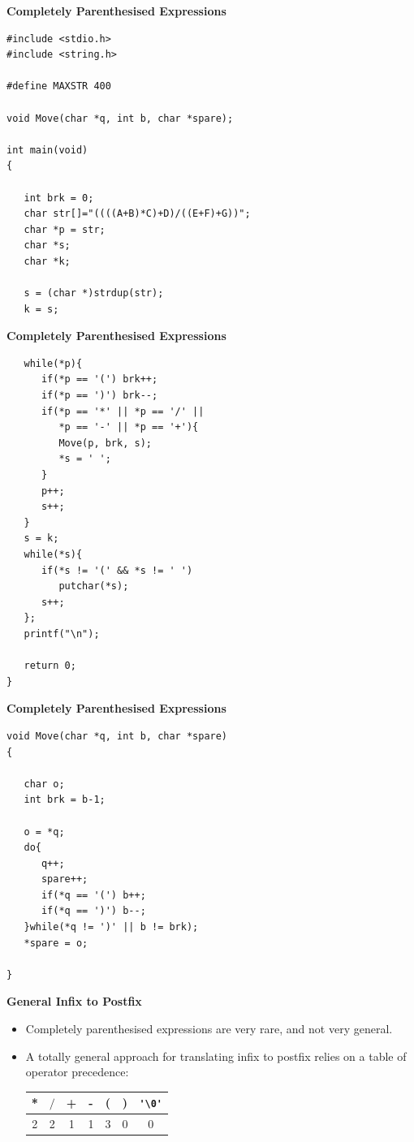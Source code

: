 \documentclass[a4,portraitt]{slides}
\begin{document}
\newpage
{\samepage
\begin{center}
{\Large{\bf Completely Parenthesised Expressions}}
\end{center}
{\small
\begin{verbatim}
#include <stdio.h>
#include <string.h>

#define MAXSTR 400

void Move(char *q, int b, char *spare);

int main(void)
{

   int brk = 0;
   char str[]="((((A+B)*C)+D)/((E+F)+G))";
   char *p = str;
   char *s;
   char *k;

   s = (char *)strdup(str);
   k = s;
\end{verbatim}
}}

\newpage
{\samepage
\begin{center}
{\Large{\bf Completely Parenthesised Expressions}}
\end{center}
{\small
\begin{verbatim}
   while(*p){
      if(*p == '(') brk++;
      if(*p == ')') brk--;
      if(*p == '*' || *p == '/' ||
         *p == '-' || *p == '+'){
         Move(p, brk, s);
         *s = ' ';
      }
      p++;
      s++;
   }
   s = k;
   while(*s){
      if(*s != '(' && *s != ' ')
         putchar(*s);
      s++;
   };
   printf("\n");

   return 0;
}
\end{verbatim}
}

\newpage
{\samepage
\begin{center}
{\Large{\bf Completely Parenthesised Expressions}}
\end{center}
\begin{verbatim}
void Move(char *q, int b, char *spare)
{

   char o;
   int brk = b-1;

   o = *q;
   do{
      q++;
      spare++;
      if(*q == '(') b++;
      if(*q == ')') b--;
   }while(*q != ')' || b != brk);
   *spare = o;

}
\end{verbatim}
}

\newpage
{\samepage
\begin{center}
{\Large{\bf General Infix to Postfix}}
\end{center}
\begin{itemize}
\item Completely parenthesised expressions are very rare, and not very general.
\item A totally general approach for translating infix to postfix relies on
a table of operator precedence:
{\large
\begin{center}
\begin{tabular}{|c|c|c|c|c|c|c|}\hline
*&$/$&+&-&(&)&\verb^'\0'^ \\ \hline
2&2&1&1&3&0&0\\\hline
\end{tabular}
\end{center}
}
\end{itemize}
}

}
\end{document}
